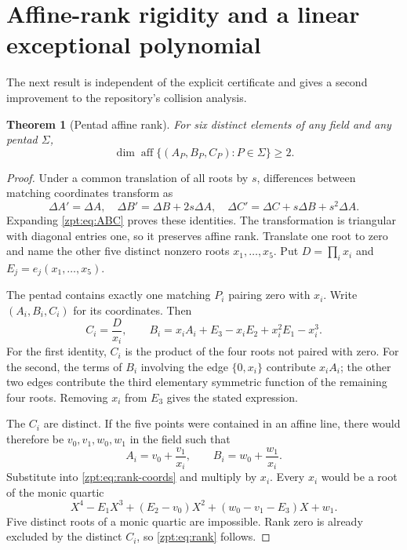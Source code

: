 \documentclass[11pt,letterpaper]{article}
\numberwithin{equation}{section}
\newtheorem{theorem}{Theorem}[section]
\theoremstyle{definition}
\theoremstyle{remark}
\DeclareMathOperator{\aff}{aff}
\begin{document}
\section{Affine-rank rigidity and a linear exceptional polynomial}
\label{zpt:sec:rank}
The next result is independent of the explicit certificate and gives a
second improvement to the repository's collision analysis.

\begin{theorem}[Pentad affine rank]
\label{zpt:thm:rank}
For six distinct elements of any field and any pentad $\Sigma$,
\begin{equation}
 \dim\aff\{(A_P,B_P,C_P):P\in\Sigma\}\ge2.\label{zpt:eq:rank}
\end{equation}
\end{theorem}
\begin{proof}
Under a common translation of all roots by $s$, differences between
matching coordinates transform as
\begin{equation}
 \Delta A'=\Delta A,\quad
 \Delta B'=\Delta B+2s\Delta A,\quad
 \Delta C'=\Delta C+s\Delta B+s^2\Delta A.\label{zpt:eq:translation}
\end{equation}
Expanding \eqref{zpt:eq:ABC} proves these identities. The transformation is
triangular with diagonal entries one, so it preserves affine rank.
Translate one root to zero and name the other five distinct nonzero
roots $x_1,\ldots,x_5$. Put
$D=\prod_i x_i$ and $E_j=e_j(x_1,\ldots,x_5)$.

The pentad contains exactly one matching $P_i$ pairing zero with $x_i$.
Write $(A_i,B_i,C_i)$ for its coordinates. Then
\begin{equation}
 C_i=\frac D{x_i},\qquad
 B_i=x_iA_i+E_3-x_iE_2+x_i^2E_1-x_i^3.\label{zpt:eq:rank-coords}
\end{equation}
For the first identity, $C_i$ is the product of the four roots not paired
with zero. For the second, the terms of $B_i$ involving the edge
$\{0,x_i\}$ contribute $x_iA_i$; the other two edges contribute the
third elementary symmetric function of the remaining four roots.
Removing $x_i$ from $E_3$ gives the stated expression.

The $C_i$ are distinct. If the five points were contained in an affine
line, there would therefore be $v_0,v_1,w_0,w_1$ in the field such that
\[
 A_i=v_0+\frac{v_1}{x_i},\qquad
 B_i=w_0+\frac{w_1}{x_i}.
\]
Substitute into \eqref{zpt:eq:rank-coords} and multiply by $x_i$. Every $x_i$
would be a root of the monic quartic
\begin{equation}
 X^4-E_1X^3+(E_2-v_0)X^2+(w_0-v_1-E_3)X+w_1.\label{zpt:eq:quartic-obstruction}
\end{equation}
Five distinct roots of a monic quartic are impossible. Rank zero is
already excluded by the distinct $C_i$, so \eqref{zpt:eq:rank} follows.
\end{proof}
\end{document}
